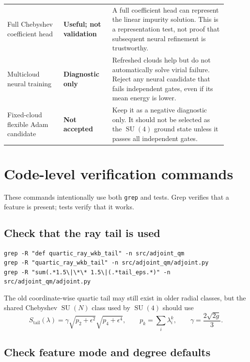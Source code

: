 \documentclass[11pt]{article}
\newcommand{\SU}{\operatorname{SU}}
\newcommand{\status}[2]{\textbf{\textcolor{#1}{#2}}}
\begin{document}
\begin{small}
\begin{longtable}{p{0.23\linewidth}p{0.20\linewidth}p{0.47\linewidth}}
\addlinespace
Full Chebyshev coefficient head & \status{statusgreen}{Useful; not validation} & A full coefficient head can represent the linear impurity solution. This is a representation test, not proof that subsequent neural refinement is trustworthy. \\
\addlinespace
Multicloud neural training & \status{statusorange}{Diagnostic only} & Refreshed clouds help but do not automatically solve virial failure. Reject any neural candidate that fails independent gates, even if its mean energy is lower. \\
\addlinespace
Fixed-cloud flexible Adam candidate & \status{statusred}{Not accepted} & Keep it as a negative diagnostic only. It should not be selected as the \(\SU(4)\) ground state unless it passes all independent gates. \\
\bottomrule
\end{longtable}
\end{small}

\section{Code-level verification commands}

These commands intentionally use both \texttt{grep} and tests. Grep verifies that a feature is present; tests verify that it works.

\subsection{Check that the ray tail is used}

\begin{lstlisting}[style=bashstyle]
grep -R "def quartic_ray_wkb_tail" -n src/adjoint_qm
grep -R "quartic_ray_wkb_tail" -n src/adjoint_qm/adjoint.py
grep -R "sum(.*1.5\|\*\* 1.5\|(.*tail_eps.*)" -n src/adjoint_qm/adjoint.py
\end{lstlisting}

The old coordinate-wise quartic tail may still exist in older radial classes, but the shared Chebyshev \(\SU(N)\) class used by \(\SU(4)\) should use
\begin{equation}
S_{\mathrm{tail}}(\lambda)=\gamma\sqrt{p_2+\epsilon^2}\sqrt{p_4+\epsilon^4},
\qquad
p_k=\sum_i\lambda_i^k,
\qquad
\gamma=\frac{2\sqrt{2g}}{3}.
\end{equation}

\subsection{Check feature mode and degree defaults}
\end{document}
